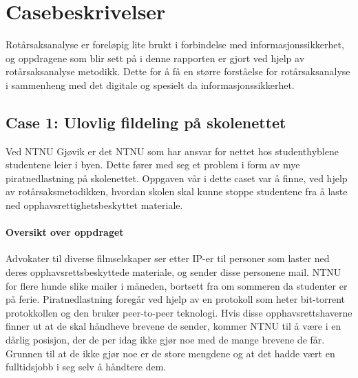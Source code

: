 \chapter{Casebeskrivelser}
\label{kap:casebeskrivelser}
Rotårsaksanalyse er foreløpig lite brukt i forbindelse med informasjonssikkerhet, og oppdragene som blir sett på i denne rapporten er gjort ved hjelp av rotårsaksanalyse metodikk. Dette for å få en større forståelse for rotårsaksanalyse i sammenheng med det digitale og spesielt da informasjonssikkerhet.

\section{Case 1: Ulovlig fildeling på skolenettet}
\label{sec:case_fildeling}
Ved NTNU Gjøvik er det NTNU som har ansvar for nettet hos studenthyblene studentene leier i byen. Dette fører med seg et problem i form av mye piratnedlastning på skolenettet. Oppgaven vår i dette caset var å finne, ved hjelp av rotårsaksmetodikken, hvordan skolen skal kunne stoppe studentene fra å laste ned opphavsrettighetsbeskyttet materiale.

\subsubsection{Oversikt over oppdraget}
Advokater til diverse filmselskaper ser etter IP-er til personer som laster ned deres opphavsrettsbeskyttede materiale, og sender disse personene mail. NTNU for flere hunde slike mailer i måneden, bortsett fra om sommeren da studenter er på ferie. Piratnedlastning foregår ved hjelp av en protokoll som heter bit-torrent protokkollen og den bruker peer-to-peer teknologi.  Hvis disse opphavsrettshaverne finner ut at de skal håndheve brevene de sender, kommer NTNU til å være i en dårlig posisjon, der de per idag ikke gjør noe med de mange brevene de får. Grunnen til at de ikke gjør noe er de store mengdene og at det hadde vært en fulltidsjobb i seg selv å håndtere dem.